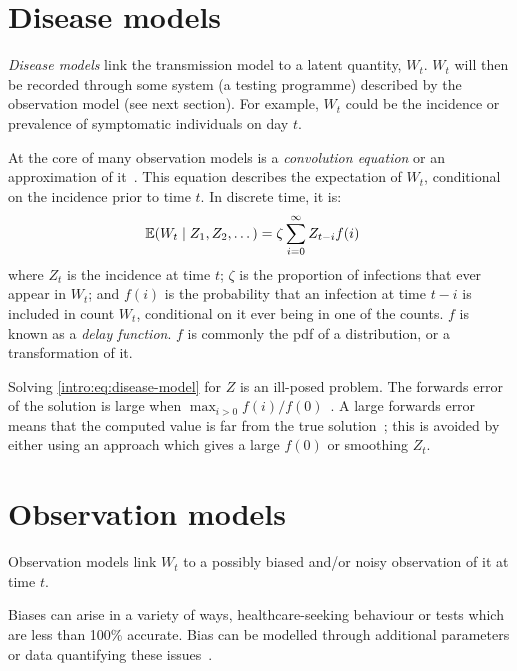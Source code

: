 \documentclass[thesis.tex]{subfiles}
\begin{document}
\section{Disease models} \label{intro:sec:disease-model}

\emph{Disease models} link the transmission model to a latent quantity, $W_t$.
$W_t$ will then be recorded through some system (\eg a testing programme) described by the observation model (see next section).
For example, $W_t$ could be the incidence or prevalence of symptomatic individuals on day $t$.

At the core of many observation models is a \emph{convolution equation} or an approximation of it~\autocite[e.g.][]{brookmeyerBackcalculation,abbottEstimating,birrellRealtimea}.
This equation describes the expectation of $W_t$, conditional on the incidence prior to time $t$.
In discrete time, it is:
\begin{align}
    \operatorname{\mathbb{E}}(W_t \mid Z_1, Z_2, \dots) &= \zeta \sum_{i=0}^\infty Z_{t-i} f(i)
    \label{intro:eq:disease-model}
\end{align}
where $Z_t$ is the incidence at time $t$; $\zeta$ is the proportion of infections that ever appear in $W_t$; and $f(i)$ is the probability that an infection at time $t-i$ is included in count $W_t$, conditional on it ever being in one of the counts.
$f$ is known as a \emph{delay function}.
$f$ is commonly the pdf of a distribution, or a transformation of it.

Solving \cref{intro:eq:disease-model} for $Z$ is an ill-posed problem.
The forwards error of the solution is large when $\max_{i > 0} f(i) / f(0)$~\autocite[chapter 8.2]{highamAccuracy}.
A large forwards error means that the computed value is far from the true solution~\autocite[6--9]{highamAccuracy}; this is avoided by either using an approach which gives a large $f(0)$ or smoothing $Z_t$.

\section{Observation models}

Observation models link $W_t$ to a possibly biased and/or noisy observation of it at time $t$.

Biases can arise in a variety of ways, \eg healthcare-seeking behaviour or tests which are less than 100\% accurate.
Bias can be modelled through additional parameters or data quantifying these issues~\autocite[e.g.][]{sherrattExploring,birrellRealtimea,nicholsonImproving,swallow2022challenges}.
\end{document}
